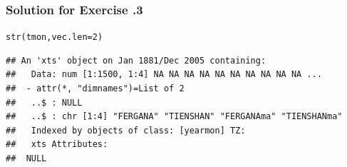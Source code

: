 \documentclass[xcolor=table, xcolor=dvipsnames]{beamer}\usepackage[]{graphicx}\usepackage[]{color}
\makeatletter
\newcommand{\hlnum}[1]{\textcolor[rgb]{0,0,0}{#1}}
\newcommand{\hlstd}[1]{\textcolor[rgb]{0,0,0}{#1}}
\newcommand{\hlkwc}[1]{\textcolor[rgb]{1,0,1}{#1}}
\newcommand{\hlkwd}[1]{\textcolor[rgb]{0,0,1}{#1}}
\newenvironment{kframe}{%
 \def\at@end@of@kframe{}%
 \ifinner\ifhmode%
  \def\at@end@of@kframe{\end{minipage}}%
  \begin{minipage}{\columnwidth}%
 \fi\fi%
 \def\FrameCommand##1{\hskip\@totalleftmargin \hskip-\fboxsep
 \colorbox{shadecolor}{##1}\hskip-\fboxsep
     \hskip-\linewidth \hskip-\@totalleftmargin \hskip\columnwidth}%
 \MakeFramed {\advance\hsize-\width
   \@totalleftmargin\z@ \linewidth\hsize
   \@setminipage}}%
 {\par\unskip\endMakeFramed%
 \at@end@of@kframe}
\newenvironment{knitrout}{}{} %
\newcounter{exercisecount}
\makeatother
\begin{document}


\begin{frame}[fragile]\frametitle{Solution for Exercise .3}
\begin{knitrout}\scriptsize
{}\color{fgcolor}\begin{kframe}
\begin{alltt}
\hlkwd{str}\hlstd{(tmon,} \hlkwc{vec.len}\hlstd{=}\hlnum{2}\hlstd{)}
\end{alltt}
\begin{verbatim}
## An 'xts' object on Jan 1881/Dec 2005 containing:
##   Data: num [1:1500, 1:4] NA NA NA NA NA NA NA NA NA NA ...
##  - attr(*, "dimnames")=List of 2
##   ..$ : NULL
##   ..$ : chr [1:4] "FERGANA" "TIENSHAN" "FERGANAma" "TIENSHANma"
##   Indexed by objects of class: [yearmon] TZ: 
##   xts Attributes:  
##  NULL
\end{verbatim}
\end{kframe}
\end{knitrout}
\end{frame}

\end{document}
